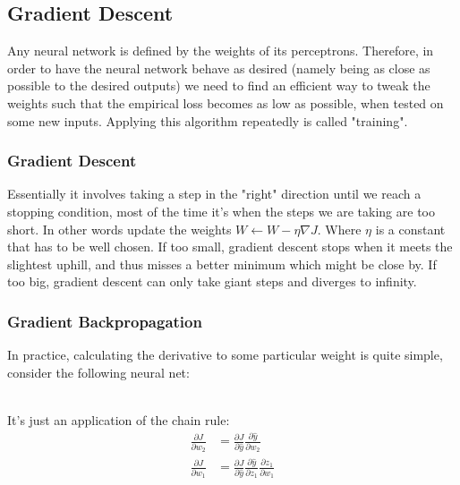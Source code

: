 \documentclass{article}
\begin{document}
\subsection{Gradient Descent}
	Any neural network is defined by the weights of its perceptrons. Therefore, in order to have the neural network behave as desired (namely being as close as possible to the desired outputs) we need to find an efficient way to tweak the weights such that the empirical loss becomes as low as possible, when tested on some new inputs. Applying this algorithm repeatedly is called "training".
	\subsubsection{Gradient Descent}
		Essentially it involves taking a step in the "right" direction until we reach a stopping condition, most of the time it's when the steps we are taking are too short. In other words update the weights $W \gets W - \eta \nabla J$. Where $\eta$ is a constant that has to be well chosen. If too small, gradient descent stops when it meets the slightest uphill, and thus misses a better minimum which might be close by. If too big, gradient descent can only take giant steps and diverges to infinity.
	\subsubsection{Gradient Backpropagation}
		In practice, calculating the derivative to some particular weight is quite simple, consider the following neural net: \\ \\
		\begin{minipage}{0.55\linewidth}

		\end{minipage}
	\begin{minipage}{0.45\linewidth}
		It's just an application of the chain rule:
		\begin{align*}
		\frac{\partial J}{\partial w_2} &=\frac{\partial J}{\partial \hat{y}} \frac{\partial \hat{y}}{\partial w_2} \\
		\frac{\partial J}{\partial w_1} &= \frac{\partial J}{\partial \hat{y}}\frac{\partial \hat{y}}{\partial z_1}\frac{\partial z_1}{\partial w_1}
		\end{align*}
	\end{minipage}
\end{document}
